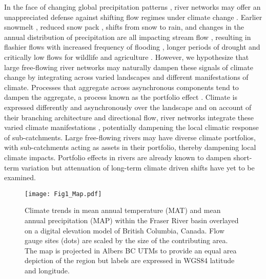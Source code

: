 \documentclass[9pt,twocolumn,twoside,lineno]{pnas-new}
\begin{document}
In the face of changing global precipitation patterns \cite{Donat:2016}, river networks may offer an unappreciated defense against shifting flow regimes under climate change \cite{Hartmann:2013,Palmer:2009}. Earlier snowmelt \cite{Rauscher:2008}, reduced snow pack \cite{McCabe:2014}, shifts from snow to rain, and changes in the annual distribution of precipitation are all impacting stream flow \cite{Hartmann:2013}, resulting in flashier flows with increased frequency of flooding \cite{Hirabayashi:2013}, longer periods of drought and critically low flows for wildlife and agriculture \cite{Melillo:2014}. However, we hypothesize that large free-flowing river networks may naturally dampen these signals of climate change by integrating across varied landscapes and different manifestations of climate. Processes that aggregate across asynchronous components tend to dampen the aggregate, a process known as the portfolio effect \cite{Doak:1998}. Climate is expressed differently and asynchronously over the landscape \cite[e.g.][]{George:2015} and on account of their branching architecture and directional flow, river networks integrate these varied climate manifestations \cite{Peterson:2013}, potentially dampening the local climatic response of sub-catchments. Large free-flowing rivers may have diverse climate portfolios, with sub-catchments acting as assets in their portfolio, thereby dampening local climate impacts. Portfolio effects in rivers are already known to dampen short-term variation \cite{Moore:2015,Yeakel:2014} but attenuation of long-term climate driven shifts have yet to be examined.

\begin{figure*}[h]
\centering
\texttt{[image: Fig1\_Map.pdf]}
	\caption{Climate trends in mean annual temperature (MAT) and mean annual precipitation (MAP) within the Fraser River basin overlayed on a digital elevation model of British Columbia, Canada. Flow gauge sites (dots) are scaled by the size of the contributing area. The map is projected in Albers BC UTMs to provide an equal area depiction of the region but labels are expressed in WGS84 latitude and longitude.}
\label{fig:1}
\end{figure*}
\end{document}
